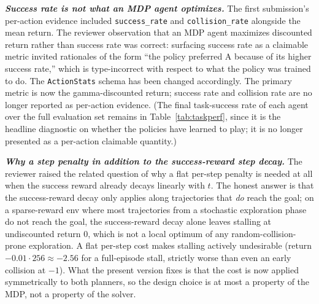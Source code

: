 \documentclass[conference]{IEEEtran}
\begin{document}
\textbf{\emph{Success rate is not what an MDP agent optimizes.}} The
first submission's per-action evidence included \texttt{success\_rate}
and \texttt{collision\_rate} alongside the mean return. The reviewer
observation that an MDP agent maximizes discounted return rather than
success rate was correct: surfacing success rate as a claimable
metric invited rationales of the form ``the policy preferred A
because of its higher success rate,'' which is type-incorrect with
respect to what the policy was trained to do. The
\texttt{ActionStats} schema has been changed accordingly. The
primary metric is now the gamma-discounted return; success rate and
collision rate are no longer reported as per-action evidence. (The
final task-success rate of each agent over the full evaluation set
remains in Table~\ref{tab:taskperf}, since it is the headline
diagnostic on whether the policies have learned to play; it is no
longer presented as a per-action claimable quantity.)

\textbf{\emph{Why a step penalty in addition to the success-reward
step decay.}} The reviewer raised the related question of why a flat
per-step penalty is needed at all when the success reward already
decays linearly with $t$. The honest answer is that the success-reward
decay only applies along trajectories that \emph{do} reach the goal;
on a sparse-reward env where most trajectories from a stochastic
exploration phase do not reach the goal, the success-reward decay
alone leaves stalling at undiscounted return $0$, which is not a
local optimum of any random-collision-prone exploration. A flat
per-step cost makes stalling actively undesirable (return
$-0.01 \cdot 256 \approx -2.56$ for a full-episode stall, strictly
worse than even an early collision at $-1$). What the present version
fixes is that the cost is now applied symmetrically to both planners,
so the design choice is at most a property of the MDP, not a property
of the solver.
\end{document}
